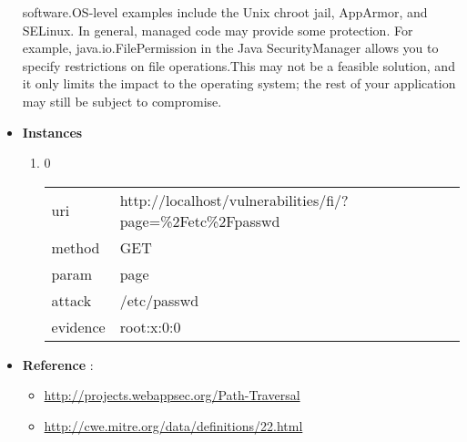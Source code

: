 \documentclass[10pt]{article}
\begin{document}
\begin{itemize}
software.OS-level examples include the Unix chroot jail, AppArmor, and SELinux. In general, managed code may provide some protection. For example, java.io.FilePermission in the Java SecurityManager allows you to specify restrictions on file operations.This may not be a feasible solution, and it only limits the impact to the operating system; the rest of your application may still be subject to compromise.
\item[] \textbf{Instances}
\begin{enumerate}
\item[] 0
\begin{tabular}{| l | p{14cm}}
uri & http://localhost/vulnerabilities/fi/?page=\%2Fetc\%2Fpasswd \\
method & GET \\
param & page \\
attack & /etc/passwd \\
evidence & root:x:0:0 \\
\end{tabular}
\end{enumerate}
\item[] \textbf{Reference} : 
\begin{itemize}
\item \url{http://projects.webappsec.org/Path-Traversal}
\item \url{http://cwe.mitre.org/data/definitions/22.html}
\end{itemize}
\end{itemize}
\end{document}
